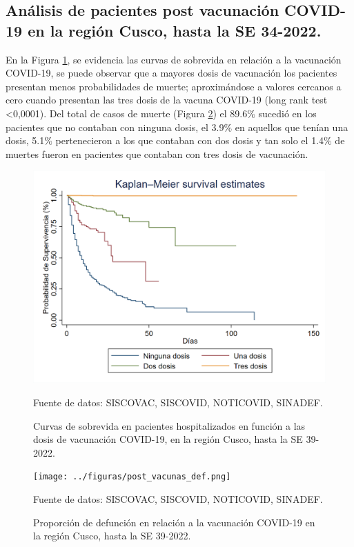 \documentclass[12pt,a4paper,openany]{book}
\begin{document}
	\clearpage
\subsection*{Análisis de pacientes post vacunación COVID-19 en la región Cusco, hasta la SE 34-2022.}
\noindent En la Figura \ref{fig:supervivencia1}, se evidencia las curvas de sobrevida en relación a la vacunación COVID-19, se puede observar que a mayores dosis de vacunación los pacientes presentan menos probabilidades de muerte; aproximándose a valores cercanos a cero cuando presentan las tres dosis de la vacuna COVID-19 (long rank test <0,0001). Del total de casos de muerte (Figura \ref{fig:defunción_postvacunación}) el 89.6$\%$ sucedió en los pacientes que no contaban con ninguna dosis, el 3.9$\%$ en aquellos que tenían una dosis, 5.1$\%$ pertenecieron a los que contaban con dos dosis y tan solo el 1.4$\%$ de muertes fueron en pacientes que contaban con tres dosis de vacunación.

\begin{figure}[h]
	\caption{Curvas de sobrevida en pacientes hospitalizados en función a las dosis de vacunación COVID-19, en la región Cusco, hasta la SE 39-2022.}\label{fig:supervivencia1}
	\begin{center}
		\includegraphics[width=0.95\linewidth]{../figuras/supervivencia_1.png}
	\end{center}
	{\footnotesize {Fuente de datos: SISCOVAC, SISCOVID, NOTICOVID, SINADEF.}}
\end{figure}

\begin{figure}[h]
	\caption{Proporción de defunción en relación a la vacunación COVID-19 en la región Cusco, hasta la SE 39-2022.}\label{fig:defunción_postvacunación}
	\begin{center}
		\texttt{[image: ../figuras/post\_vacunas\_def.png]}
	\end{center}
	{\footnotesize {Fuente de datos: SISCOVAC, SISCOVID, NOTICOVID, SINADEF.}}
\end{figure}
\end{document}
